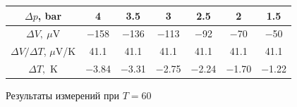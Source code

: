 \documentclass[a4paper,12pt]{report}
\begin{document}
    \begin{figure}[H]
        \centering
        \begin{tabular}{|c|c|c|c|c|c|c|}
            \hline
            $\Delta p$, bar & 4 & 3.5 & 3 & 2.5 & 2 & 1.5 \\
            \hline
            $\Delta V, \ \mu$V & $-$158 & $-$136 & $-$113 & $-$92 & $-$70 & $-$50 \\
            \hline
            $\Delta V/\Delta T$, $\mu\text{V}$/K & 41.1 & 41.1 & 41.1 & 41.1 & 41.1 & 41.1 \\
            \hline
            $\Delta T,$ K & $-$3.84 & $-$3.31 & $-$2.75 & $-$2.24 & $-$1.70 & $-$1.22 \\
            \hline
        \end{tabular}
        \caption{Результаты измерений при $T=60$ \celsius}
    \end{figure}
\end{document}
